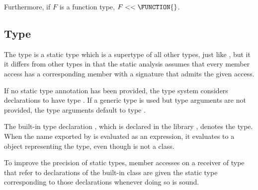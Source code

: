 \documentclass[makeidx]{article}
\begin{document}
{\LMHash{}%
Furthermore, if $F$ is a function type, $F << \FUNCTION{}$.


\subsection{Type \DYNAMIC{}}

\LMHash{}%
The type \DYNAMIC{} is a static type which is a supertype of all other types,
just like ,
but it it differs from other types in that the static analysis
assumes that every member access has a corresponding member
with a signature that admits the given access.


\LMHash{}%
If no static type annotation has been provided,
the type system considers declarations to have type \DYNAMIC{}.
If a generic type is used but type arguments are not provided,
the type arguments default to type \DYNAMIC{}.


\LMHash{}%
The built-in type declaration ,
which is declared in the library ,
denotes the \DYNAMIC{} type.
When the name \DYNAMIC{} exported by  is evaluated as an expression,
it evaluates to a  object representing the \DYNAMIC{} type,
even though \DYNAMIC{} is not a class.


\LMHash{}%
To improve the precision of static types,
member accesses on a receiver of type \DYNAMIC{} that refer to
declarations of the built-in class 
are given the static type corresponding to those declarations
whenever doing so is sound.

}
\end{document}
